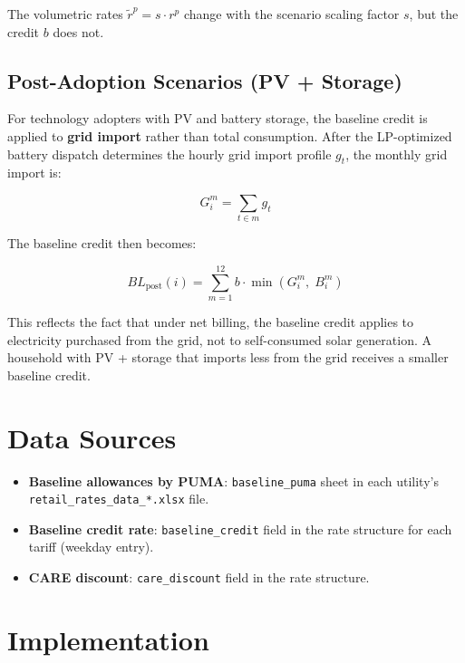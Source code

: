 \documentclass[11pt]{article}
\begin{document}
The volumetric rates $\tilde{r}^p = s \cdot r^p$ change with the scenario scaling factor $s$, but the credit $b$ does not.

\subsection{Post-Adoption Scenarios (PV + Storage)}

For technology adopters with PV and battery storage, the baseline credit is applied to \textbf{grid import} rather than total consumption. After the LP-optimized battery dispatch determines the hourly grid import profile $g_t$, the monthly grid import is:

\begin{equation}
    G_i^m = \sum_{t \in m} g_t
\end{equation}

The baseline credit then becomes:

\begin{equation}
    BL_{\text{post}}(i) = \sum_{m=1}^{12} b \cdot \min\!\left(G_i^m,\; B_i^m\right)
\end{equation}

This reflects the fact that under net billing, the baseline credit applies to electricity purchased from the grid, not to self-consumed solar generation. A household with PV + storage that imports less from the grid receives a smaller baseline credit.

\section{Data Sources}

\begin{itemize}
    \item \textbf{Baseline allowances by PUMA}: \texttt{baseline\_puma} sheet in each utility's \texttt{retail\_rates\_data\_*.xlsx} file.
    \item \textbf{Baseline credit rate}: \texttt{baseline\_credit} field in the rate structure for each tariff (weekday entry).
    \item \textbf{CARE discount}: \texttt{care\_discount} field in the rate structure.
\end{itemize}

\section{Implementation}
\end{document}
